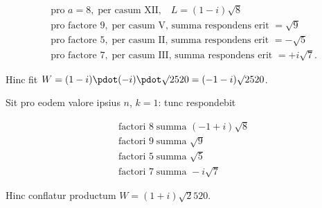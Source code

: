 {\small
\[
\begin{aligned}
&\text{pro }a=8,\;\text{per casum XII,}\quad L=(1-i)\surd8\\
&\text{pro factore }9,\;\text{per casum V, summa respondens erit }=\surd9\\
&\text{pro factore }5,\;\text{per casum II, summa respondens erit }=-\surd5\\
&\text{pro factore }7,\;\text{per casum III, summa respondens erit }=+i\surd7\mathord{.}
\end{aligned}
\]
}

Hinc fit $W=(1-i)\pdot(-i)\pdot\surd2520=(-1-i)\surd2520$.

Sit pro eodem valore ipsius $n$, $k=1$: tunc respondebit

\[
\begin{aligned}
&\text{factori }8\;\text{summa }(-1+i)\surd8\\
&\text{factori }9\;\text{summa }\surd9\\
&\text{factori }5\;\text{summa }\surd5\\
&\text{factori }7\;\text{summa }-i\surd7
\end{aligned}
\]

Hinc conflatur productum $W=(1+i)\surd2520$.
